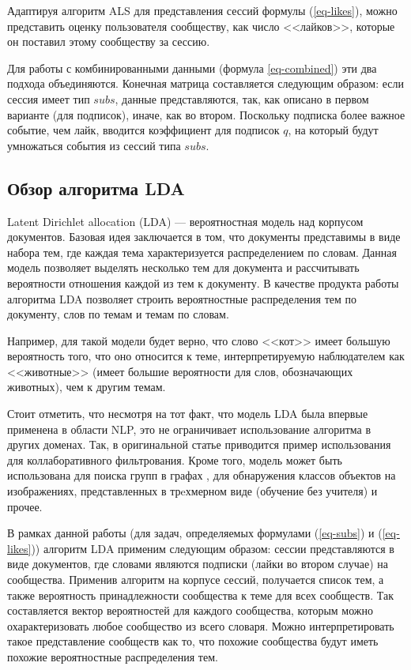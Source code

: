\documentclass[times,specification,annotation]{itmo-student-thesis}
\begin{document}
Адаптируя алгоритм ALS \cite{koren2009} для представления сессий формулы (\ref{eq-likes}), можно представить оценку пользователя сообществу, как число <<лайков>>, которые он поставил этому сообществу за сессию.

Для работы с комбинированными данными (формула \ref{eq-combined}) эти два подхода объединяются. Конечная матрица составляется следующим образом: если сессия имеет тип $subs$, данные представляются, так, как описано в первом варианте (для подписок), иначе, как во втором. Поскольку подписка более важное событие, чем лайк, вводится коэффициент для подписок $q$, на который будут умножаться события из сессий типа $subs$.   

\subsection{Обзор алгоритма LDA}\label{sec:lda}

Latent Dirichlet allocation (LDA) \cite{lda2003} --- вероятностная модель над корпусом документов. Базовая идея заключается в том, что документы представимы в виде набора тем, где каждая тема характеризуется распределением по словам. Данная модель позволяет выделять несколько тем для документа и рассчитывать вероятности отношения каждой из тем к документу.
В качестве продукта работы алгоритма LDA позволяет строить вероятностные распределения тем по документу, слов по темам и темам по словам.

Например, для такой модели будет верно, что слово <<кот>> имеет большую вероятность того, что оно относится к теме, интерпретируемую наблюдателем как <<животные>> (имеет большие вероятности для слов, обозначающих животных), чем к другим темам. 

Стоит отметить, что несмотря на тот факт, что модель LDA была впервые применена в области NLP, это не ограничивает использование алгоритма в других доменах. Так, в оригинальной статье \cite{lda2003} приводится пример использования для коллаборативного фильтрования. Кроме того, модель может быть использована для поиска групп в графах \cite{Henderson2009}, для обнаружения классов объектов на изображениях, представленных в трeхмерном виде (обучение без учителя) \cite{Endres2009} и прочее.

В рамках данной работы (для задач, определяемых формулами (\ref{eq-subs}) и (\ref{eq-likes})) алгоритм LDA применим следующим образом: сессии представляются в виде документов, где словами являются подписки (лайки во втором случае) на сообщества. Применив алгоритм на корпусе сессий, получается список тем, а также вероятность принадлежности сообщества к теме для всех сообществ. Так составляется вектор вероятностей для каждого сообщества, которым можно охарактеризовать любое сообщество из всего словаря. Можно интерпретировать такое представление сообществ как то, что похожие сообщества будут иметь похожие вероятностные распределения тем. 
\end{document}
